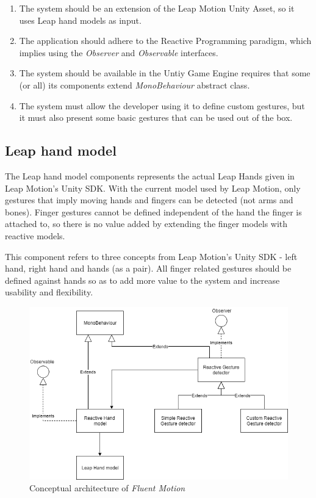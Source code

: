 \documentclass[12pt,a4paper,twoside]{report}
\begin{document}
\begin{enumerate}
  \item The system should be an extension of the Leap Motion Unity Asset, so it uses Leap hand models as input. \label{req:leap}
  \item The application should adhere to the Reactive Programming paradigm, which implies using the \textit{Observer} and \textit{Observable} interfaces. \label{req:rx}
  \item The system should be available in the Untiy Game Engine requires that some (or all) its components extend \textit{MonoBehaviour} abstract class. \label{req:unity}
  \item The system must allow the developer using it to define custom gestures, but it must also present some basic gestures that can be used out of the box. \label{req:custom}
\end{enumerate}  

\subsection{Leap hand model}
The Leap hand model components represents the actual Leap Hands given in Leap Motion's Unity SDK. With the current model used by Leap Motion, only gestures that imply moving hands and fingers can be detected (not arms and bones). Finger gestures cannot be defined independent of the hand the finger is attached to, so there is no value added by extending the finger models with reactive models.

This component refers to three concepts from Leap Motion's Unity SDK - left hand, right hand and hands (as a pair). All finger related gestures should be defined against hands so as to add more value to the system and increase usability and flexibility.

\begin{figure}[t]
  \centering
  \includegraphics[width=0.9\linewidth]{img/Thesis_conceptual_arch.png}
  \caption{Conceptual architecture of \textit{Fluent Motion}}
  \label{fig:arch}
\end{figure}
\end{document}

